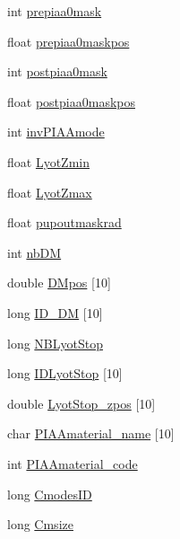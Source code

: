 \begin{DoxyCompactItemize}
\item 
int \hyperlink{structOPTPIAACMCDESIGN_a4f424ef8e93fc3f0a89c37a9c5972820}{prepiaa0mask}
\item 
float \hyperlink{structOPTPIAACMCDESIGN_a4f6c7b87f374eefda6c212329be7ba43}{prepiaa0maskpos}
\item 
int \hyperlink{structOPTPIAACMCDESIGN_a392b32b63ba511bff062e98c941814aa}{postpiaa0mask}
\item 
float \hyperlink{structOPTPIAACMCDESIGN_a5fb317d6c29f6d774462ae4f6b6c3e09}{postpiaa0maskpos}
\item 
int \hyperlink{structOPTPIAACMCDESIGN_adaa80b18e792715b3aaa88cc278a878c}{inv\+P\+I\+A\+Amode}
\item 
float \hyperlink{structOPTPIAACMCDESIGN_aaf6a20a5f06d13546d4145fd878727bf}{Lyot\+Zmin}
\item 
float \hyperlink{structOPTPIAACMCDESIGN_a45bce5969d933b75f2002fc35d9366a8}{Lyot\+Zmax}
\item 
float \hyperlink{structOPTPIAACMCDESIGN_a65968979dd96a614a86fd7eb34238e83}{pupoutmaskrad}
\item 
int \hyperlink{structOPTPIAACMCDESIGN_abcbc2dfd1fde61c341f2689b1ed810dd}{nb\+D\+M}
\item 
double \hyperlink{structOPTPIAACMCDESIGN_ad508d17e469e18e4d2d8034bf0f23ea6}{D\+Mpos} \mbox{[}10\mbox{]}
\item 
long \hyperlink{structOPTPIAACMCDESIGN_a01002138c2aeb8f60ce18ab70bac6a15}{I\+D\+\_\+\+D\+M} \mbox{[}10\mbox{]}
\item 
long \hyperlink{structOPTPIAACMCDESIGN_aacf0223dec146b41ded13305b83c8ba6}{N\+B\+Lyot\+Stop}
\item 
long \hyperlink{structOPTPIAACMCDESIGN_a58b78571969e6a7a7d33a1439f264889}{I\+D\+Lyot\+Stop} \mbox{[}10\mbox{]}
\item 
double \hyperlink{structOPTPIAACMCDESIGN_ac58466d4fb98041f6a1279ce0e1092b1}{Lyot\+Stop\+\_\+zpos} \mbox{[}10\mbox{]}
\item 
char \hyperlink{structOPTPIAACMCDESIGN_abf3280f1ad15a23b5cf9f05942ca6d69}{P\+I\+A\+Amaterial\+\_\+name} \mbox{[}10\mbox{]}
\item 
int \hyperlink{structOPTPIAACMCDESIGN_a9fc6f0b8de4e0e7fe0694cd8f4e827e1}{P\+I\+A\+Amaterial\+\_\+code}
\item 
long \hyperlink{structOPTPIAACMCDESIGN_a34261c3f4264eb64be04cacd186aa1fc}{Cmodes\+I\+D}
\item 
long \hyperlink{structOPTPIAACMCDESIGN_a0943c7f88d6cc19f0d93aec976c33abf}{Cmsize}
\item 

\end{DoxyCompactItemize}

